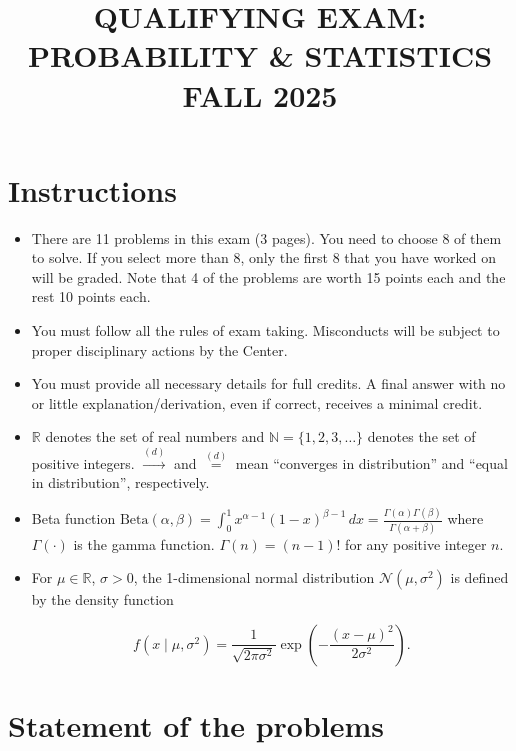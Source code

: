 \documentclass[11pt,a4paper]{article}
\title{\textbf{QUALIFYING EXAM: PROBABILITY \& STATISTICS}\\[0.5em]\Large FALL 2025}
\date{}
\author{}
\begin{document}
\maketitle
\vspace{-3em}

\tableofcontents

\section{Instructions}
\begin{itemize}
    \item There are 11 problems in this exam (3 pages). You need to choose 8 of them to solve. If you select more than 8, only the first 8 that you have worked on will be graded. Note that 4 of the problems are worth 15 points each and the rest 10 points each.
    \item You must follow all the rules of exam taking. Misconducts will be subject to proper disciplinary actions by the Center.
    \item You must provide all necessary details for full credits. A final answer with no or little explanation/derivation, even if correct, receives a minimal credit.
    \item \( \mathbb{R} \) denotes the set of real numbers and \( \mathbb{N} = \{1, 2, 3, \dots\} \) denotes the set of positive integers. \( \xrightarrow{(d)} \) and \( \stackrel{(d)}{=} \) mean ``converges in distribution'' and ``equal in distribution'', respectively.
    \item Beta function \( \mathrm{Beta}(\alpha, \beta) = \int_0^1 x^{\alpha-1}(1-x)^{\beta-1}\, dx = \frac{\Gamma(\alpha)\Gamma(\beta)}{\Gamma(\alpha+\beta)} \) where \( \Gamma(\cdot) \) is the gamma function. \( \Gamma(n) = (n-1)! \) for any positive integer \( n \).
    \item For \( \mu \in \mathbb{R} \), \( \sigma > 0 \), the 1-dimensional normal distribution \( \mathcal{N}(\mu, \sigma^2) \) is defined by the density function

    \[
    f(x \mid \mu, \sigma^2) = \frac{1}{\sqrt{2\pi\sigma^2}} \exp\left( -\frac{(x-\mu)^2}{2\sigma^2} \right).
    \]
\end{itemize}

\section{Statement of the problems}
\end{document}
